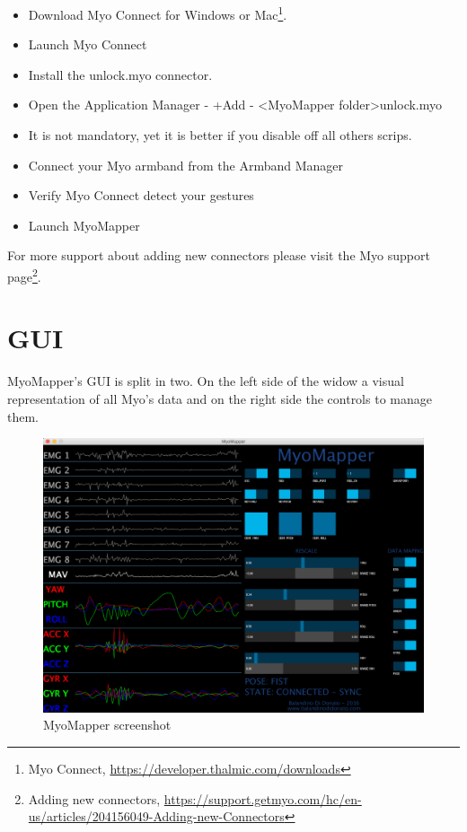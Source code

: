 \documentclass[12pt,a4paper]{article}
\begin{document}
\begin{itemize}
	\item Download Myo Connect for Windows or Mac\footnote{Myo Connect, \url{https://developer.thalmic.com/downloads}}.
	\item Launch Myo Connect
	\item Install the unlock.myo connector.
	\item Open the Application Manager
	\subitem - +Add 
	\subitem - \textless MyoMapper folder\textgreater \textfractionsolidus unlock.myo
	\item It is not mandatory, yet it is better if you disable off all others scrips.
	\item Connect your Myo armband from the Armband Manager
	\item Verify Myo Connect detect your gestures
	\item Launch MyoMapper
\end{itemize}

For more support about adding new connectors please visit the Myo support page\footnote{Adding new connectors,  \url{https://support.getmyo.com/hc/en-us/articles/204156049-Adding-new-Connectors}}.

\newpage
\section{GUI}

	MyoMapper's GUI is split in two. On the left side of the widow a visual representation of all Myo's data and on the right side the controls to manage them.
	
	\begin{figure}[h]
		\centering
		\includegraphics[width=1\linewidth]{../MyoMapper}
		\caption{MyoMapper screenshot}
		\label{fig:MyoMapperGUI}
	\end{figure}
	
\end{document}
